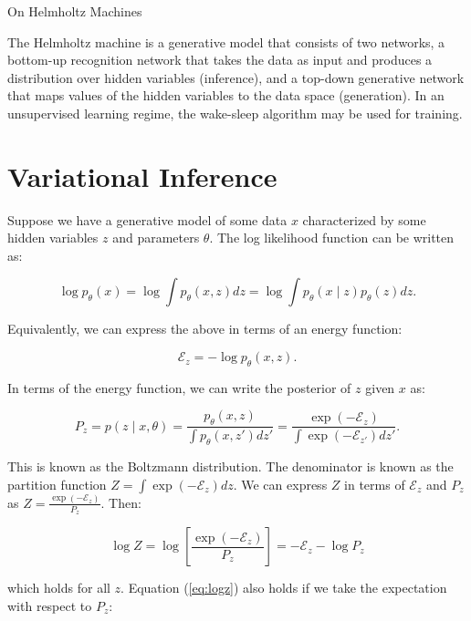 \documentclass[11pt]{article}
\def\E{\mathcal{E}}
\begin{document}
\begin{center}
{\huge On Helmholtz Machines} 
\end{center}

The Helmholtz machine \cite{DayanHintonNealEtAl95} is a generative model that consists of two networks, a bottom-up recognition network that takes the data as input and produces a distribution over hidden variables (inference), and a top-down generative network that maps values of the hidden variables to the data space (generation). In an unsupervised learning regime, the wake-sleep algorithm may be used for training.

\section{Variational Inference}

Suppose we have a generative model of some data $x$ characterized by some hidden variables $z$ and parameters $\theta$. The log likelihood function can be written as:

\begin{equation}
\log p_\theta(x) = \log \int p_\theta(x, z) dz = \log \int p_\theta(x \mid z) p_\theta(z) dz.
\end{equation}

Equivalently, we can express the above in terms of an energy function:

\begin{equation}
\mathcal{E}_z= -\log p_\theta(x, z).
\label{eq:energy}
\end{equation} 

In terms of the energy function, we can write the posterior of $z$ given $x$ as:

\begin{equation}
P_z = p(z\mid x,\theta) = \frac{p_\theta(x, z)}{\int p_\theta(x, z') dz'}  = \frac{\exp(-\E_z)}{\int \exp(-\E_{z'}) dz'} .
\end{equation} 

This is known as the Boltzmann distribution. The denominator is known as the partition function $Z = \int \exp(-\mathcal{E}_{z}) dz$. We can express $Z$ in terms of $\mathcal{E}_z$ and $P_z$ as $Z = \frac{\exp(-\mathcal{E}_z)}{P_z}$. Then:

\begin{equation}
\log Z =  \log \left[ \frac{\exp(-\E_z)}{P_z} \right] = -\E_z -\log P_z
\label{eq:logz}
\end{equation}

which holds for all $z$. Equation (\ref{eq:logz}) also holds if we take the expectation with respect to $P_z$:
\end{document}
